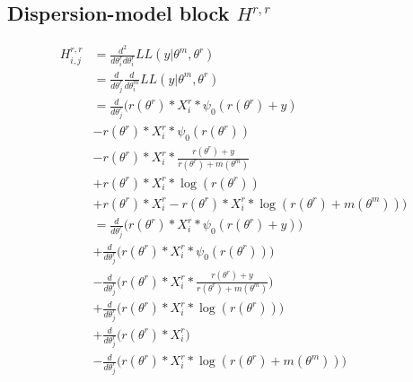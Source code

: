 \documentclass[bibliography=totoc,10pt]{scrartcl}
\begin{document}
\subsection{Dispersion-model block $H^{r,r}$}
\begin{equation}
\begin{split}
H^{r,r}_{i,j} &= \frac{d^2}{d \theta^r_i d \theta^r_i} LL(y|\theta^m, \theta^r) \\
&= \frac{d}{d \theta^r_j} \frac{d}{d \theta^m_i} LL(y|\theta^m, \theta^r) \\
&= \frac{d}{d \theta^r_j} \bigg( r(\theta^r) * X^r_{i} * \psi_0(r(\theta^r)+y) \\
&- r(\theta^r) * X^r_{i} * \psi_0(r(\theta^r)) \\
&- r(\theta^r) * X^r_{i} * \frac{r(\theta^r) + y}{r(\theta^r)+m(\theta^m)} \\
&+ r(\theta^r) * X^r_{i} * \log(r(\theta^r)) \\
&+ r(\theta^r) * X^r_{i} - r(\theta^r) * X^r_{i} * \log(r(\theta^r)+m(\theta^m)) \bigg) \\
&= \frac{d}{d \theta^r_j} \bigg( r(\theta^r) * X^r_{i} * \psi_0(r(\theta^r)+y) \bigg) \\
&+ \frac{d}{d \theta^r_j} \bigg( r(\theta^r) * X^r_{i} * \psi_0(r(\theta^r)) \bigg) \\
&- \frac{d}{d \theta^r_j} \bigg( r(\theta^r) * X^r_{i} * \frac{r(\theta^r) + y}{r(\theta^r)+m(\theta^m)} \bigg) \\
&+ \frac{d}{d \theta^r_j} \bigg( r(\theta^r) * X^r_{i} * \log(r(\theta^r)) \bigg) \\
&+ \frac{d}{d \theta^r_j} \bigg( r(\theta^r) * X^r_{i}  \bigg) \\
&- \frac{d}{d \theta^r_j} \bigg( r(\theta^r) * X^r_{i} * \log(r(\theta^r)+m(\theta^m)) \bigg) \\
\end{split}
\end{equation}
\end{document}
